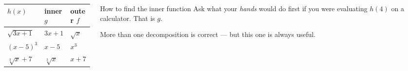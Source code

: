 \documentclass[aspectratio=169, 11pt]{beamer}
\begin{document}
\begin{frame}[t, plain]
  \begin{columns}[T]
    \begin{column}{0.52\textwidth}
      \footnotesize
      \begin{center}
      \renewcommand{\arraystretch}{1.4}
      \begin{tabular}{|l|l|l|}
      \hline
      $h(x)$ & \textbf{inner $g$} & \textbf{outer $f$} \\ \hline
      $\sqrt{3x+1}$ & $3x+1$ & $\sqrt{x}$ \\ \hline
      $(x-5)^{3}$ & $x-5$ & $x^{3}$ \\ \hline
      $\sqrt[3]{x}+7$ & $\sqrt[3]{x}$ & $x+7$ \\ \hline
      \end{tabular}
      \end{center}
    \end{column}
    \begin{column}{0.44\textwidth}
      \footnotesize
      \begin{block}{How to find the inner function}
        Ask what your \emph{hands} would do first if you were evaluating $h(4)$ on a calculator.
        That is $g$.
      \end{block}
      \vspace{4pt}
      More than one decomposition is correct --- but this one is always useful.
    \end{column}
  \end{columns}
\end{frame}
\end{document}

